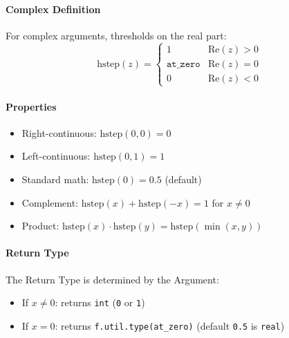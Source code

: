 \paragraph{Complex Definition}
For complex arguments, thresholds on the real part:
\[
\text{hstep}(z) = \begin{cases} 1 & \text{Re}(z) > 0 \\ \texttt{at\_zero} & \text{Re}(z) = 0 \\ 0 & \text{Re}(z) < 0 \end{cases}
\]

\paragraph{Properties}
\begin{itemize}
\item Right-continuous: $\text{hstep}(0, 0) = 0$
\item Left-continuous: $\text{hstep}(0, 1) = 1$
\item Standard math: $\text{hstep}(0) = 0.5$ (default)
\item Complement: $\text{hstep}(x) + \text{hstep}(-x) = 1$ for $x \neq 0$
\item Product: $\text{hstep}(x) \cdot \text{hstep}(y) = \text{hstep}(\min(x, y))$
\end{itemize}

\paragraph{Return Type}
The Return Type is determined by the Argument:
\begin{itemize}
\item If $x \neq 0$: returns \texttt{int} (\texttt{0} or \texttt{1})
\item If $x = 0$: returns \texttt{f.util.type(at\_zero)} (default \texttt{0.5} is \texttt{real})
\end{itemize}

